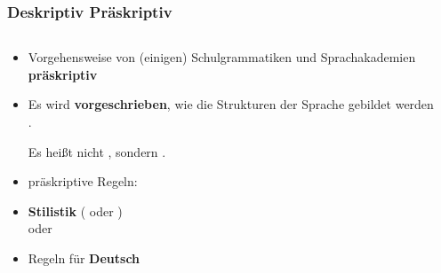 \begin{frame}
	\frametitle{Deskriptiv \vs Präskriptiv}
\begin{columns}
\begin{column}{.6\textwidth}

\begin{itemize}
	\item Vorgehensweise von (einigen) Schulgrammatiken und Sprachakademien \ras \textbf{präskriptiv}
	
	\medskip
	\item Es wird \textbf{vorgeschrieben}, wie die Strukturen der Sprache gebildet werden .	

\ea Es heißt nicht , sondern .	
\z

	\item präskriptive Regeln:
	
	\item[] \textbf{Stilistik} ( oder )\\
	oder\\
	
	\item[] Regeln für  \textbf{Deutsch}
\end{itemize}


\end{column}
\begin{column}{.4\textwidth}


\end{column}
\end{columns}
\end{frame}
